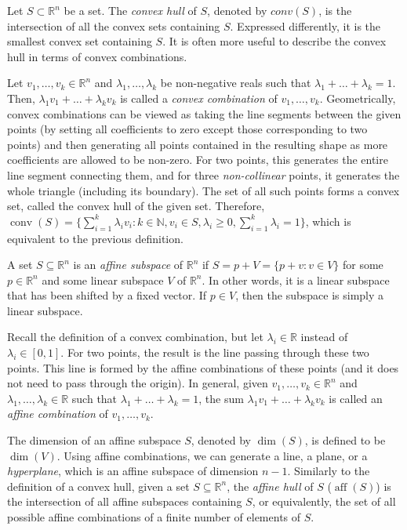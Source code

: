 \documentclass[12pt]{report}
\numberwithin{algorithm}{chapter}
\begin{document}
	Let $S \subset \mathbb{R}^{n}$ be a set. The \emph{convex hull} of $S$, denoted by $\mathit{conv(S)}$, is the intersection of all the convex sets containing $S$. Expressed differently, it is the smallest convex set containing $S$. It is often more useful to describe the convex hull in terms of convex combinations.
	
	Let $v_{1}, \ldots, v_{k} \in \mathbb{R}^{n}$ and $\lambda_{1}, \ldots, \lambda_{k}$ be non-negative reals such that $\lambda_{1} + \ldots + \lambda_{k} = 1$. Then, $\lambda_{1}v_{1} + \ldots + \lambda_{k}v_{k}$ is called a \emph{convex combination} of $v_{1}, \ldots, v_{k}$. Geometrically, convex combinations can be viewed as taking the line segments between the given points (by setting all coefficients to zero except those corresponding to two points) and then generating all points contained in the resulting shape as more coefficients are allowed to be non-zero. For two points, this generates the entire line segment connecting them, and for three \emph{non-collinear} points, it generates the whole triangle (including its boundary). The set of all such points forms a convex set, called the convex hull of the given set. Therefore, $\operatorname{conv}(S) = \{\sum_{i = 1}^{k} \lambda_{i} v_{i} : k \in \mathbb{N}, v_{i} \in S, \lambda_{i} \geq 0, \sum_{i = 1}^{k} \lambda_{i} = 1 \}$, which is equivalent to the previous definition.
	
	A set $S \subseteq \mathbb{R}^{n}$ is an \emph{affine subspace} of $\mathbb{R}^{n}$ if $S = p + V = \{p + v : v \in V\}$ for some $p \in \mathbb{R}^{n}$ and some linear subspace $V$ of $\mathbb{R}^{n}$. In other words, it is a linear subspace that has been shifted by a fixed vector. If $p \in V$, then the subspace is simply a linear subspace. 
	
	Recall the definition of a convex combination, but let $\lambda_{i} \in \mathbb{R}$ instead of $\lambda_{i} \in [0, 1]$. For two points, the result is the line passing through these two points. This line is formed by the affine combinations of these points (and it does not need to pass through the origin). In general, given $v_{1}, \ldots, v_{k} \in \mathbb{R}^{n}$ and $\lambda_{1}, \ldots, \lambda_{k} \in \mathbb{R}$ such that $\lambda_{1} + \ldots + \lambda_{k} = 1$, the sum $\lambda_{1}v_{1} + \ldots + \lambda_{k}v_{k}$ is called an \emph{affine combination} of $v_{1}, \ldots, v_{k}$. 
	
	The dimension of an affine subspace $S$, denoted by $\operatorname{dim}(S)$, is defined to be $\operatorname{dim}(V)$. Using affine combinations, we can generate a line, a plane, or a \emph{hyperplane}, which is an affine subspace of dimension $n - 1$. Similarly to the definition of a convex hull, given a set $S \subseteq \mathbb{R}^{n}$, the \emph{affine hull} of $S$ ($\operatorname{aff}(S)$)  is the intersection of all affine subspaces containing $S$, or equivalently, the set of all possible affine combinations of a finite number of elements of $S$. 
	
\end{document}
